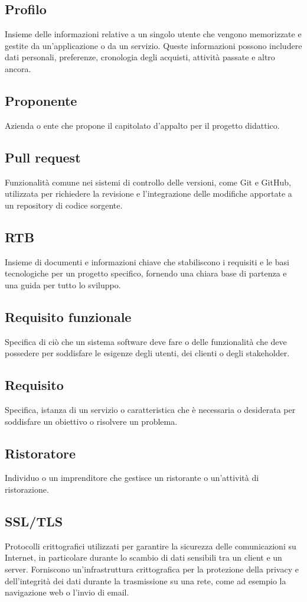 \subsection{Profilo}Insieme delle informazioni relative a un singolo utente che vengono memorizzate e gestite da un'applicazione o da un servizio. Queste informazioni possono includere dati personali, preferenze, cronologia degli acquisti, attività passate e altro ancora.
\subsection{Proponente}Azienda o ente che propone il capitolato d’appalto per il progetto didattico.
\subsection{Pull request}Funzionalità comune nei sistemi di controllo delle versioni, come Git e GitHub, utilizzata per richiedere la revisione e l'integrazione delle modifiche apportate a un repository di codice sorgente.
\subsection{RTB}Insieme di documenti e informazioni chiave che stabiliscono i requisiti e le basi tecnologiche per un progetto specifico, fornendo una chiara base di partenza e una guida per tutto lo sviluppo.
\subsection{Requisito funzionale}Specifica di ciò che un sistema software deve fare o delle funzionalità che deve possedere per soddisfare le esigenze degli utenti, dei clienti o degli stakeholder.
\subsection{Requisito}Specifica, istanza di un servizio o caratteristica che è necessaria o desiderata per soddisfare un obiettivo o risolvere un problema.
\subsection{Ristoratore}Individuo o un imprenditore che gestisce un ristorante o un'attività di ristorazione.
\subsection{SSL/TLS}Protocolli crittografici utilizzati per garantire la sicurezza delle comunicazioni su Internet, in particolare durante lo scambio di dati sensibili tra un client e un server. Forniscono un'infrastruttura crittografica per la protezione della privacy e dell'integrità dei dati durante la trasmissione su una rete, come ad esempio la navigazione web o l'invio di email.
